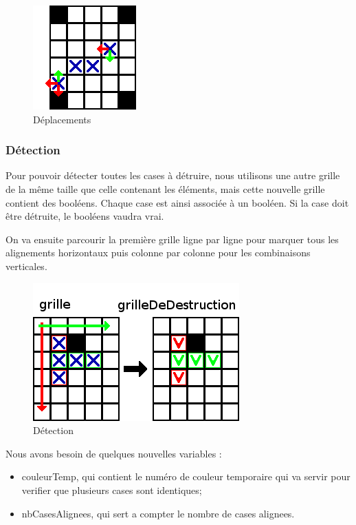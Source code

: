\begin{figure}[h]
	\center
	\caption{\label{verifDepl} Déplacements}
	\includegraphics{imgs/verifDepl}
\end{figure}
		
\subsubsection{Détection}	
	
Pour pouvoir détecter toutes les cases à détruire, nous utilisons une autre grille de la même taille que celle contenant les éléments, mais cette nouvelle grille contient des booléens. Chaque case est ainsi associée à un booléen. Si la case doit être détruite, le booléens vaudra vrai.

On va ensuite parcourir la première grille ligne par ligne pour marquer tous les alignements horizontaux puis colonne par colonne pour les combinaisons verticales.

\begin{figure}[h]
	\center
	\caption{\label{Detection} Détection}
	\includegraphics{imgs/Detection}
\end{figure}

Nous avons besoin de quelques nouvelles variables :

\begin{itemize}
\item
	couleurTemp, qui contient le numéro de couleur temporaire qui va servir pour verifier que plusieurs cases sont identiques;
\item
	nbCasesAlignees, qui sert a compter le nombre de cases alignees.
\end{itemize}

